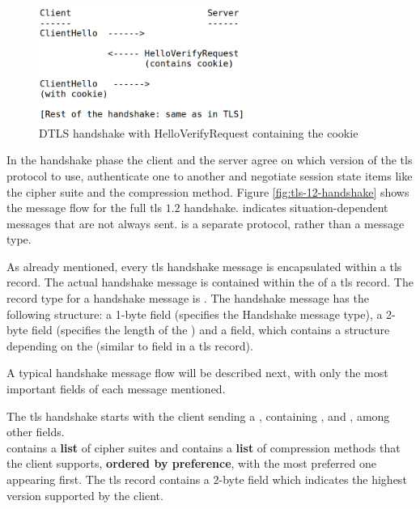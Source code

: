 \documentclass{llncs}
\begin{document}
\begin{figure}
  \centering
  \includegraphics[width=0.6\textwidth]{img/dtls-cookie.png} %
  \caption{\label{fig:dtls-cookie} DTLS handshake with HelloVerifyRequest containing the cookie}
\end{figure}


In the handshake phase the client and the server agree on which version of the \gls{tls}
protocol to use, authenticate one to another and negotiate session state items like
the cipher suite and the compression method.  Figure \ref{fig:tls-12-handshake} shows the message flow for the
full \gls{tls} $1.2$ handshake. \codeword{*} indicates situation-dependent
messages that are not always sent.  is a separate
protocol, rather than a message type.

As already mentioned, every \gls{tls} handshake message is encapsulated within
a \gls{tls} record. The actual handshake message is contained within the
 of a \gls{tls} record. The record type for a handshake
message is . The handshake message has the following structure:
a 1-byte  field (specifies the Handshake message type),
a 2-byte  field (specifies the length of the )
and a  field, which contains a structure depending on the
 (similar to  field in a \gls{tls} record).

A typical handshake message flow will be described next, with only the most important fields of each message mentioned.

The \gls{tls} handshake starts with the client sending a , containing ,  and ,
among other fields.
\\ contains a \textbf{list} of cipher suites and 
contains a \textbf{list} of compression methods that the
client supports, \textbf{ordered by preference}, with the most preferred one appearing first.
The \gls{tls} record contains a $2$-byte  field which
indicates the highest version supported by the client.
\end{document}
